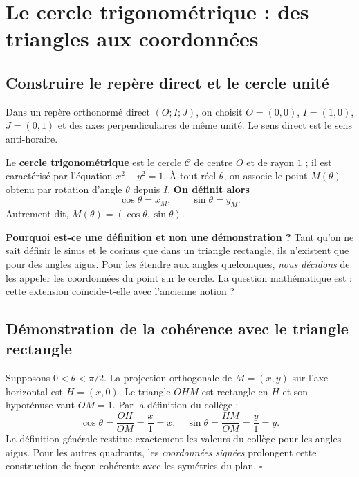 \documentclass[../cours_spe_trigo.tex]{subfiles}
\begin{document}
\setcounter{chapter}{3}
\chapter{Le cercle trigonométrique : des triangles aux coordonnées}
\section{Construire le repère direct et le cercle unité}
Dans un repère orthonormé direct $(O;I;J)$, on choisit $O=(0,0)$, $I=(1,0)$, $J=(0,1)$ et des axes perpendiculaires de même unité. Le sens direct est le sens anti-horaire.
\begin{definition}
Le \textbf{cercle trigonométrique} est le cercle $\mathcal C$ de centre $O$ et de rayon $1$ ; il est caractérisé par l'équation $x^2+y^2=1$. À tout réel $\theta$, on associe le point $M(\theta)$ obtenu par rotation d'angle $\theta$ depuis $I$. \textbf{On définit alors}
\[\boxed{\cos\theta=x_M,\qquad\sin\theta=y_M.}\]
Autrement dit, $M(\theta)=(\cos\theta,\sin\theta)$.
\end{definition}
\begin{center}
\end{center}
\textbf{Pourquoi est-ce une définition et non une démonstration ?} Tant qu'on ne sait définir le sinus et le cosinus que dans un triangle rectangle, ils n'existent que pour des angles aigus. Pour les étendre aux angles quelconques, \emph{nous décidons} de les appeler les coordonnées du point sur le cercle. La question mathématique est : cette extension coïncide-t-elle avec l'ancienne notion ?

\section{Démonstration de la cohérence avec le triangle rectangle}
\begin{demonstration}
Supposons $0<\theta<\pi/2$. La projection orthogonale de $M=(x,y)$ sur l'axe horizontal est $H=(x,0)$. Le triangle $OHM$ est rectangle en $H$ et son hypoténuse vaut $OM=1$. Par la définition du collège :
\[
\cos\theta=\frac{OH}{OM}=\frac{x}{1}=x,
\quad
\sin\theta=\frac{HM}{OM}=\frac{y}{1}=y.
\]
La définition générale restitue exactement les valeurs du collège pour les angles aigus. Pour les autres quadrants, les \emph{coordonnées signées} prolongent cette construction de façon cohérente avec les symétries du plan. $\square$
\end{demonstration}
\end{document}
